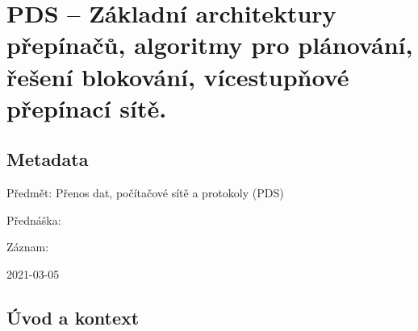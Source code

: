 

\graphicspath{{pds/architektura_prepinacu}}


\chapter{PDS -- Základní architektury přepínačů, algoritmy pro plánování, řešení blokování, vícestupňové přepínací sítě.}


\section{Metadata}

\begin{compactitem}
    \item Předmět: Přenos dat, počítačové sítě a protokoly (PDS)
    \item Přednáška:
    \begin{compactitem}
        \item {}
    \end{compactitem}
    \item Záznam:
    \begin{compactitem}
        \item 2021-03-05
    \end{compactitem}
\end{compactitem}


\section{Úvod a kontext}

